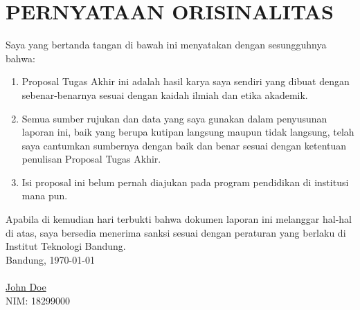 \chapter*{PERNYATAAN ORISINALITAS}
\vspace{2cm}
Saya yang bertanda tangan di bawah ini menyatakan dengan sesungguhnya bahwa:
\begin{enumerate}
    \item Proposal Tugas Akhir ini adalah hasil karya saya sendiri yang dibuat dengan sebenar-benarnya sesuai dengan kaidah ilmiah dan etika akademik.
    \item Semua sumber rujukan dan data yang saya gunakan dalam penyusunan laporan ini, baik yang berupa kutipan langsung maupun tidak langsung, telah saya cantumkan sumbernya dengan baik dan benar sesuai dengan ketentuan penulisan Proposal Tugas Akhir.
    \item Isi proposal ini belum pernah diajukan pada program pendidikan di institusi mana pun.
\end{enumerate}
Apabila di kemudian hari terbukti bahwa dokumen laporan ini melanggar hal-hal di atas, saya bersedia menerima sanksi sesuai dengan peraturan yang berlaku di Institut Teknologi Bandung.
\\[2cm]
Bandung, \today\\
\\[2cm]

\underline{John Doe} \\
NIM: 18299000
  